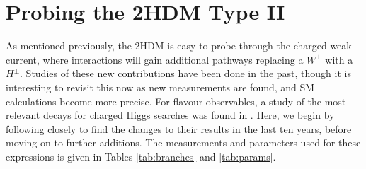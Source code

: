\documentclass[a4paper,12pt]{article}
\begin{document}
\section{Probing the 2HDM Type II}
\label{sec:probe}
As mentioned previously, the 2HDM is easy to probe through the charged weak current, where interactions will gain additional pathways replacing a $W^{\pm}$ with a $H^{\pm}$. 
Studies of these new contributions have been done in the past, though it is interesting to revisit this now as new measurements are found, and SM calculations become more precise.
For flavour observables, a study of the most relevant decays for charged Higgs searches was found in \cite{desc}.
Here, we begin by following \cite{desc} closely to find the changes to their results in the last ten years, before moving on to further additions. 
The measurements and parameters used for these expressions is given in Tables \ref{tab:branches} and \ref{tab:params}.
\end{document}
